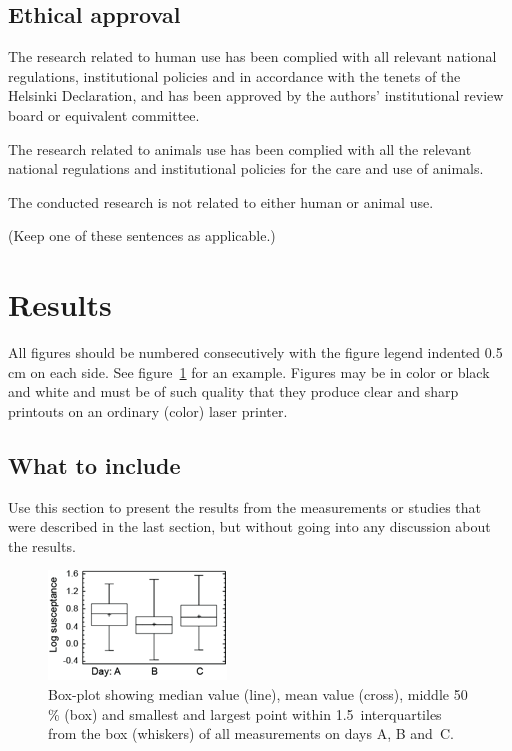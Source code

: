 \documentclass{elbioimp2}
\begin{document}
\subsection{Ethical approval}
The research related to human use has been complied with all relevant
national regulations, institutional policies and in accordance with
the tenets of the Helsinki Declaration, and has been approved by the
authors’ institutional review board or equivalent committee.

The research related to animals use has been complied with all the
relevant national regulations and institutional policies for the care
and use of animals.

The conducted research is not related to either human or animal use.

(Keep one of these sentences as applicable.)

\section{Results}
All figures should be numbered consecutively with the figure legend
indented 0.5\,cm on each side. See figure~\ref{box-plot} for an example.
Figures may be in color or black and white and must be of such quality
that they produce clear and sharp printouts on an ordinary (color)
laser printer.

\subsection{What to include}
Use this section to present the results from the measurements or
studies that were described in the last section, but without going
into any discussion about the results.

\begin{figure}[htp]
  \centering
  \includegraphics[width=0.7\columnwidth]{test-ill}
  \caption{Box-plot showing median value (line), mean value (cross),
    middle 50\,\% (box) and smallest and largest point within 
    1.5~interquartiles from the box (whiskers) of all measurements
    on days A, B and~C.\label{box-plot}}
\end{figure}
\end{document}

